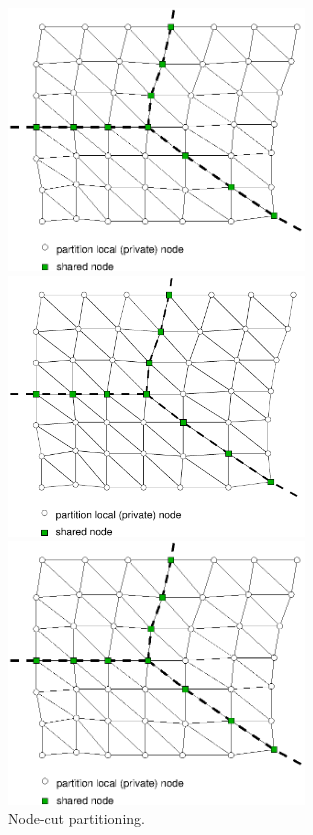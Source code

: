 \documentclass[a4paper]{article}
\begin{document}
\begin{figure}[htb]
\begin{htmlonly}
  \centerline{\includegraphics[width=0.7\textwidth]{nodecut0cb.eps}}
\end{htmlonly}
\ifpdf
\centerline{\includegraphics[width=0.7\textwidth]{nodecut0cb.pdf}}
\else
\centerline{\includegraphics[width=0.7\textwidth]{nodecut0cb.eps}}
\fi
\caption{Node-cut partitioning.}
\label{nodecut}
\end{figure}
\end{document}
